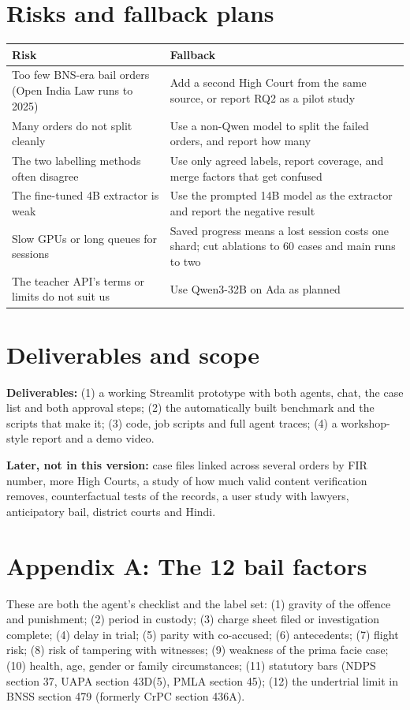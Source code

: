 \documentclass[11pt,a4paper]{article}
\begin{document}
\section{Risks and fallback plans}

{\small
\begin{xltabular}{\linewidth}{@{}P{5.6cm}L@{}}
\toprule
\textbf{Risk} & \textbf{Fallback} \\
\midrule
\endhead
Too few BNS-era bail orders (Open India Law runs to 2025) & Add a second High Court from the same source, or report RQ2 as a pilot study \\
Many orders do not split cleanly & Use a non-Qwen model to split the failed orders, and report how many \\
The two labelling methods often disagree & Use only agreed labels, report coverage, and merge factors that get confused \\
The fine-tuned 4B extractor is weak & Use the prompted 14B model as the extractor and report the negative result \\
Slow GPUs or long queues for sessions & Saved progress means a lost session costs one shard; cut ablations to 60 cases and main runs to two \\
The teacher API's terms or limits do not suit us & Use Qwen3-32B on Ada as planned \\
\bottomrule
\end{xltabular}}

\section{Deliverables and scope}

\textbf{Deliverables:} (1) a working Streamlit prototype with both agents, chat, the case list and both approval steps; (2) the automatically built benchmark and the scripts that make it; (3) code, job scripts and full agent traces; (4) a workshop-style report and a demo video.

\textbf{Later, not in this version:} case files linked across several orders by FIR number, more High Courts, a study of how much valid content verification removes, counterfactual tests of the records, a user study with lawyers, anticipatory bail, district courts and Hindi.

\section*{Appendix A: The 12 bail factors}

These are both the agent's checklist and the label set: (1) gravity of the offence and punishment; (2) period in custody; (3) charge sheet filed or investigation complete; (4) delay in trial; (5) parity with co-accused; (6) antecedents; (7) flight risk; (8) risk of tampering with witnesses; (9) weakness of the prima facie case; (10) health, age, gender or family circumstances; (11) statutory bars (NDPS section 37, UAPA section 43D(5), PMLA section 45); (12) the undertrial limit in BNSS section 479 (formerly CrPC section 436A).
\end{document}
